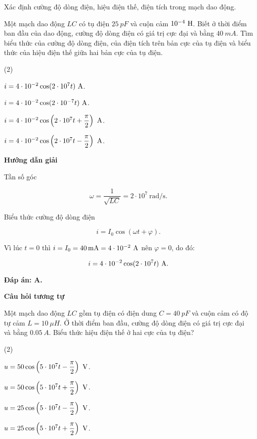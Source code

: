\begin{dang}{Xác định cường độ dòng điện, hiệu điện thế, điện tích trong mạch dao động.}
{	Một mạch dao động $LC$ có tụ điện $\SI{25}{pF}$ và cuộn cảm $10^{-4}\ \text H$. Biết ở thời điểm ban đầu của dao động, cường độ dòng điện có giá trị cực đại và bằng $\SI{40}{mA}$. Tìm biểu thức của cường độ dòng điện, của điện tích trên bản cực của tụ điện và biểu thức của hiệu điện thế giữa hai bản cực của tụ điện.
		\begin{mcq}(2)
			\item $i = 4\cdot 10^{-2} \cos(2 \cdot 10^7 t)\ \text A$. 
			\item $i = 4\cdot 10^{-2} \cos(2 \cdot 10^{-7} t)\ \text A$. 
			\item $i = 4\cdot 10^{-2} \cos \left(2 \cdot 10^7 t + \dfrac{\pi}{2}\right)\ \text A$. 
			\item $i = 4\cdot 10^{-2} \cos \left(2 \cdot 10^7 t - \dfrac{\pi}{2}\right)\ \text A$. 
		\end{mcq}
	}
	{	\begin{center}
			\textbf{Hướng dẫn giải}
		\end{center}
		
		Tần số góc 
		
		$$\omega  = \dfrac{1}{\sqrt{LC}} = 2 \cdot 10^7\ \text{rad/s}.$$
		
		Biểu thức cường độ dòng điện 
		
		$$i = I_0 \cos (\omega t + \varphi).$$
		
		Vì lúc $t = 0$ thì $i = I_0 = \SI{40}{mA} = 4 \cdot 10^{-2}\ \text A$ nên $\varphi = 0$, do đó: 
		
		$$i = 4\cdot 10^{-2} \cos (2 \cdot 10^7 t)\ \text A.$$
		
		\textbf{Đáp án: A.}
		
		
		\begin{center}
			\textbf{Câu hỏi tương tự}
		\end{center}
		
		Một mạch dao động $LC$ gồm tụ điện có điện dung $C = \SI{40}{pF}$ và cuộn cảm có độ tự cảm $L = \SI{10}{\mu H}$. Ở thời điểm ban đầu, cường độ dòng điện có giá trị cực đại và bằng $\SI{0,05}{A}$. Biểu thức hiệu điện thế ở hai cực của tụ điện?
		
		\begin{mcq}(2)
			\item $u = 50 \cos \left(5 \cdot 10^7 t - \dfrac{\pi}{2}\right)\ \text V$. 
			\item $u = 50 \cos \left(5 \cdot 10^7 t + \dfrac{\pi}{2}\right)\ \text V$. 
			\item $u = 25 \cos \left(5 \cdot 10^7 t - \dfrac{\pi}{2}\right)\ \text V$. 
			\item $u = 25 \cos \left(5 \cdot 10^7 t + \dfrac{\pi}{2}\right)\ \text V$. 
		\end{mcq}
		
}
\end{dang}
